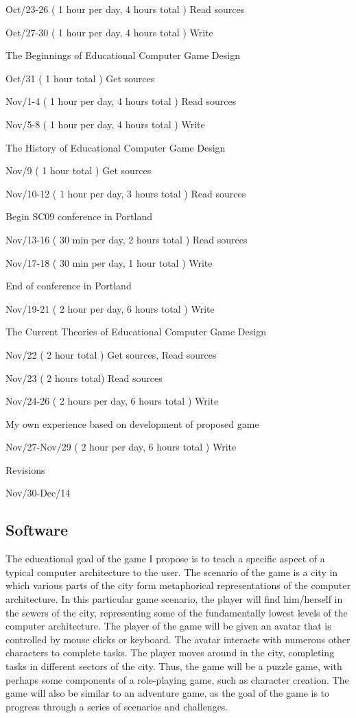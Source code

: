 \documentclass[11pt]{article}	%
\begin{document}
Oct/23-26 ( 1 hour per day, 4 hours total ) Read sources

Oct/27-30 ( 1 hour per day, 4 hours total ) Write


The Beginnings of Educational Computer Game Design


Oct/31 ( 1 hour total )  Get sources

Nov/1-4 ( 1 hour per day, 4 hours total )  Read sources

Nov/5-8 ( 1 hour per day, 4 hours total )  Write


The History of Educational Computer Game Design


Nov/9 ( 1 hour total ) Get sources

Nov/10-12 ( 1 hour per day, 3 hours total ) Read sources


Begin SC09 conference in Portland


Nov/13-16 ( 30 min per day, 2 hours total ) Read sources

Nov/17-18 ( 30 min per day, 1 hour total ) Write


End of conference in Portland


Nov/19-21 ( 2 hour per day, 6 hours total ) Write


The Current Theories of Educational Computer Game Design


Nov/22 ( 2 hour total ) Get sources, Read sources

Nov/23 ( 2 hours total) Read sources

Nov/24-26 ( 2 hours per day, 6 hours total ) Write


My own experience based on development of proposed game


Nov/27-Nov/29 ( 2 hour per day, 6 hours total ) Write


Revisions


Nov/30-Dec/14

\subsection*{Software}

The educational goal of the game I propose is to teach a specific aspect of a typical computer architecture to the user.  The scenario of the game is a city in which various parts of the city form metaphorical representations of the computer architecture.  In this particular game scenario, the player will find him/herself in the sewers of the city, representing some of the fundamentally lowest levels of the computer architecture.  The player of the game will be given an avatar that is controlled by mouse clicks or keyboard.  The avatar interacts with numerous other characters to complete tasks.  The player moves around in the city, completing tasks in different sectors of the city.  Thus, the game will be a puzzle game, with perhaps some components of a role-playing game, such as character creation.  The game will also be similar to an adventure game, as the goal of the game is to progress through a series of scenarios and challenges.
\end{document}
